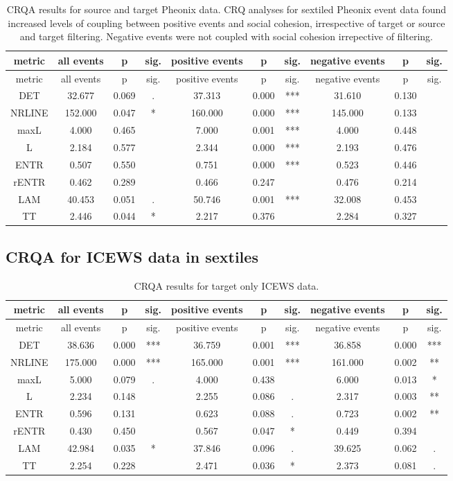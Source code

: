 \documentclass[english,man]{apa6}
\begin{document}
\begin{longtable}[]{@{}cccccccccc@{}}
\caption{CRQA results for source and target Pheonix data.
CRQ analyses for sextiled Pheonix event data found increased levels of coupling between positive events and social cohesion, irrespective of target or source and target filtering. Negative events were not coupled with social cohesion irrepective of filtering.}\tabularnewline
\toprule
metric & all events & p & sig. & positive events & p & sig. & negative events & p & sig.\tabularnewline
\midrule
\endfirsthead
\toprule
metric & all events & p & sig. & positive events & p & sig. & negative events & p & sig.\tabularnewline
\midrule
\endhead
DET & 32.677 & 0.069 & . & 37.313 & 0.000 & *** & 31.610 & 0.130 &\tabularnewline
NRLINE & 152.000 & 0.047 & * & 160.000 & 0.000 & *** & 145.000 & 0.133 &\tabularnewline
maxL & 4.000 & 0.465 & & 7.000 & 0.001 & *** & 4.000 & 0.448 &\tabularnewline
L & 2.184 & 0.577 & & 2.344 & 0.000 & *** & 2.193 & 0.476 &\tabularnewline
ENTR & 0.507 & 0.550 & & 0.751 & 0.000 & *** & 0.523 & 0.446 &\tabularnewline
rENTR & 0.462 & 0.289 & & 0.466 & 0.247 & & 0.476 & 0.214 &\tabularnewline
LAM & 40.453 & 0.051 & . & 50.746 & 0.001 & *** & 32.008 & 0.453 &\tabularnewline
TT & 2.446 & 0.044 & * & 2.217 & 0.376 & & 2.284 & 0.327 &\tabularnewline
\bottomrule
\end{longtable}

\hypertarget{crqa-for-icews-data-in-sextiles}{%
\subsection{CRQA for ICEWS data in sextiles}\label{crqa-for-icews-data-in-sextiles}}

\begin{longtable}[]{@{}cccccccccc@{}}
\caption{CRQA results for target only ICEWS data.}\tabularnewline
\toprule
metric & all events & p & sig. & positive events & p & sig. & negative events & p & sig.\tabularnewline
\midrule
\endfirsthead
\toprule
metric & all events & p & sig. & positive events & p & sig. & negative events & p & sig.\tabularnewline
\midrule
\endhead
DET & 38.636 & 0.000 & *** & 36.759 & 0.001 & *** & 36.858 & 0.000 & ***\tabularnewline
NRLINE & 175.000 & 0.000 & *** & 165.000 & 0.001 & *** & 161.000 & 0.002 & **\tabularnewline
maxL & 5.000 & 0.079 & . & 4.000 & 0.438 & & 6.000 & 0.013 & *\tabularnewline
L & 2.234 & 0.148 & & 2.255 & 0.086 & . & 2.317 & 0.003 & **\tabularnewline
ENTR & 0.596 & 0.131 & & 0.623 & 0.088 & . & 0.723 & 0.002 & **\tabularnewline
rENTR & 0.430 & 0.450 & & 0.567 & 0.047 & * & 0.449 & 0.394 &\tabularnewline
LAM & 42.984 & 0.035 & * & 37.846 & 0.096 & . & 39.625 & 0.062 & .\tabularnewline
TT & 2.254 & 0.228 & & 2.471 & 0.036 & * & 2.373 & 0.081 & .\tabularnewline
\bottomrule
\end{longtable}
\end{document}
